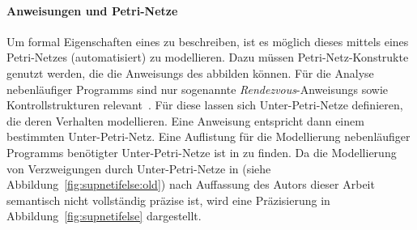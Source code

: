 \paragraph{Anweisungen und Petri-Netze}
Um formal Eigenschaften eines  zu beschreiben, ist es möglich dieses mittels eines Petri-Netzes (automatisiert) zu modellieren. Dazu müssen Petri-Netz-Konstrukte genutzt werden, die die \glspl{Anweisung} des  abbilden können. Für die Analyse nebenläufiger \glspl{Programm} sind nur sogenannte \emph{Rendezvous}-\glspl{Anweisung} sowie Kontrollstrukturen relevant~\cite{Goel1990}. Für diese lassen sich Unter-Petri-Netze definieren, die deren Verhalten modellieren. Eine Anweisung entspricht dann einem bestimmten Unter-Petri-Netz. Eine Auflistung für die Modellierung nebenläufiger \glspl{Programm} benötigter Unter-Petri-Netze ist in \cite{Goel1990} zu finden. Da die Modellierung von Verzweigungen durch Unter-Petri-Netze in \cite[Abbildung 3.1]{Goel1990} (siehe Abbildung~\ref{fig:supnetifelse:old}) nach Auffassung des Autors dieser Arbeit semantisch nicht vollständig präzise ist, wird eine Präzisierung in Abbildung~\ref{fig:supnetifelse} dargestellt. 

